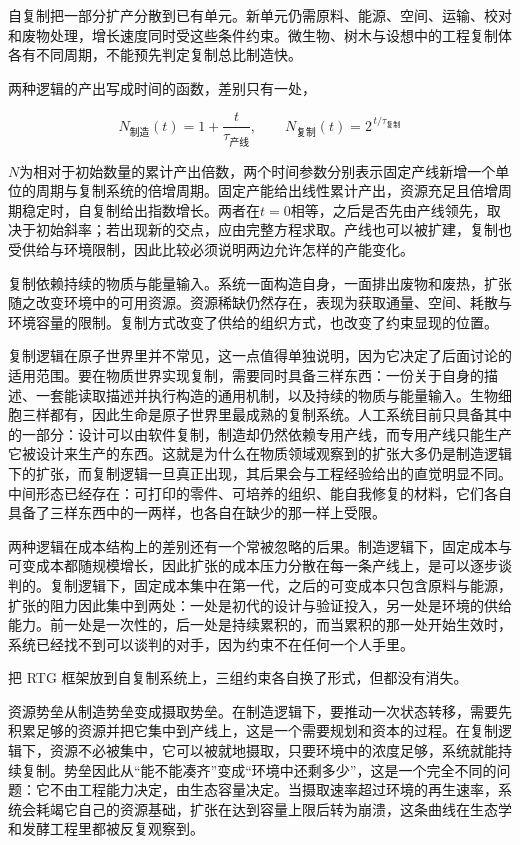 自复制把一部分扩产分散到已有单元。新单元仍需原料、能源、空间、运输、校对和废物处理，增长速度同时受这些条件约束。微生物、树木与设想中的工程复制体各有不同周期，不能预先判定复制总比制造快。

两种逻辑的产出写成时间的函数，差别只有一处，

\begin{equation}
N_{\text{制造}}(t)=1+\frac{t}{\tau_{\text{产线}}},
\qquad
N_{\text{复制}}(t)=2^{\,t/\tau_{\text{复制}}}
\end{equation}

$N$为相对于初始数量的累计产出倍数，两个时间参数分别表示固定产线新增一个单位的周期与复制系统的倍增周期。固定产能给出线性累计产出，资源充足且倍增周期稳定时，自复制给出指数增长。两者在$t=0$相等，之后是否先由产线领先，取决于初始斜率；若出现新的交点，应由完整方程求取。产线也可以被扩建，复制也受供给与环境限制，因此比较必须说明两边允许怎样的产能变化。

复制依赖持续的物质与能量输入。系统一面构造自身，一面排出废物和废热，扩张随之改变环境中的可用资源。资源稀缺仍然存在，表现为获取通量、空间、耗散与环境容量的限制。复制方式改变了供给的组织方式，也改变了约束显现的位置。

复制逻辑在原子世界里并不常见，这一点值得单独说明，因为它决定了后面讨论的适用范围。要在物质世界实现复制，需要同时具备三样东西：一份关于自身的描述、一套能读取描述并执行构造的通用机制，以及持续的物质与能量输入。生物细胞三样都有，因此生命是原子世界里最成熟的复制系统。人工系统目前只具备其中的一部分：设计可以由软件复制，制造却仍然依赖专用产线，而专用产线只能生产它被设计来生产的东西。这就是为什么在物质领域观察到的扩张大多仍是制造逻辑下的扩张，而复制逻辑一旦真正出现，其后果会与工程经验给出的直觉明显不同。中间形态已经存在：可打印的零件、可培养的组织、能自我修复的材料，它们各自具备了三样东西中的一两样，也各自在缺少的那一样上受限。

两种逻辑在成本结构上的差别还有一个常被忽略的后果。制造逻辑下，固定成本与可变成本都随规模增长，因此扩张的成本压力分散在每一条产线上，是可以逐步谈判的。复制逻辑下，固定成本集中在第一代，之后的可变成本只包含原料与能源，扩张的阻力因此集中到两处：一处是初代的设计与验证投入，另一处是环境的供给能力。前一处是一次性的，后一处是持续累积的，而当累积的那一处开始生效时，系统已经找不到可以谈判的对手，因为约束不在任何一个人手里。


把 RTG 框架放到自复制系统上，三组约束各自换了形式，但都没有消失。

资源势垒从制造势垒变成摄取势垒。在制造逻辑下，要推动一次状态转移，需要先积累足够的资源并把它集中到产线上，这是一个需要规划和资本的过程。在复制逻辑下，资源不必被集中，它可以被就地摄取，只要环境中的浓度足够，系统就能持续复制。势垒因此从“能不能凑齐”变成“环境中还剩多少”，这是一个完全不同的问题：它不由工程能力决定，由生态容量决定。当摄取速率超过环境的再生速率，系统会耗竭它自己的资源基础，扩张在达到容量上限后转为崩溃，这条曲线在生态学和发酵工程里都被反复观察到。

